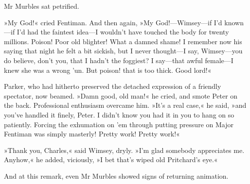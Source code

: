 Mr Murbles sat petrified.

»My God!« cried Fentiman. And then again, »My God!---Wimsey\allowbreak---\allowbreak if I'd known\allowbreak---\allowbreak if I'd had the faintest idea\allowbreak---\allowbreak I wouldn't have touched the body for twenty millions. Poison! Poor old blighter! What a damned shame! I remember now his saying that night he felt a bit sickish, but I never thought\allowbreak---\allowbreak I say, Wimsey\allowbreak---\allowbreak you do believe, don't you, that I hadn't the foggiest? I say\allowbreak---\allowbreak that awful female\allowbreak---\allowbreak I knew she was a wrong 'un. But poison! that is too thick. Good lord!«

Parker, who had hitherto preserved the detached expression of a friendly spectator, now beamed. »Damn good, old man!« he cried, and smote Peter on the back. Professional enthusiasm overcame him. »It's a real case,« he said, »and you've handled it finely, Peter. I didn't know you had it in you to hang on so patiently. Forcing the exhumation on 'em through putting pressure on Major Fentiman was simply masterly! Pretty work! Pretty work!«

»Thank you, Charles,« said Wimsey, dryly. »I'm glad somebody appreciates me. Anyhow,« he added, viciously, »I bet that's wiped old Pritchard's eye.«

And at this remark, even Mr Murbles showed signs of returning animation.